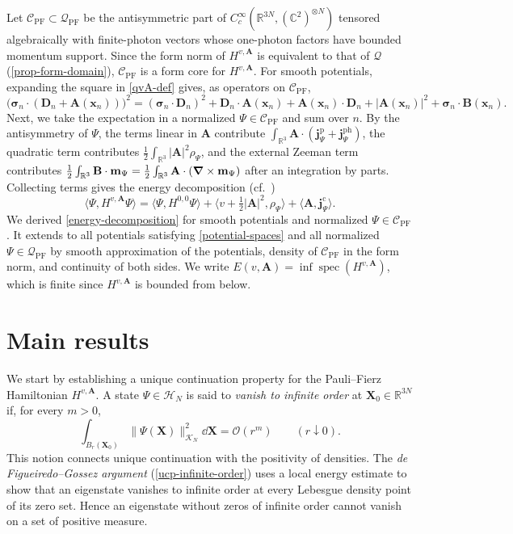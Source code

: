 \documentclass[final,reqno]{amsart}
\DeclareMathOperator{\spec}{spec}
\theoremstyle{remark}
\newcommand{\RR}{\mathbb{R}}
\newcommand{\CC}{\mathbb{C}}
\newcommand{\dua}[2]{\langle #1, #2 \rangle}
\newcommand{\HC}{\mathcal{H}}
\newcommand{\Cc}{\mathcal{C}}
\newcommand{\vjp}{\mathbf{j}^{\mathrm{p}}}
\newcommand{\vjph}{\mathbf{j}^{\mathrm{ph}}}
\newcommand{\vjc}{\mathbf{j}^{\mathrm{c}}}
\newcommand{\PF}{\mathrm{PF}}
\newcommand{\vsigma}{{\bm{\sigma}}}
\newcommand{\vm}{\mathbf{m}}
\newcommand{\vx}{\mathbf{x}}
\newcommand{\vA}{{\mathbf{A}}}
\newcommand{\vB}{{\mathbf{B}}}
\newcommand{\vX}{{\mathbf{X}}}
\newcommand{\vD}{{\mathbf{D}}}
\begin{document}
Let $\Cc_\PF\subset\mathcal Q_\PF$ be the antisymmetric part of
$C_c^\infty(\RR^{3N},(\CC^2)^{\otimes N})$ tensored algebraically with
finite-photon vectors whose one-photon factors have bounded momentum
support.  Since the form norm of $H^{v,\vA}$ is equivalent to that of
$\mathcal Q$ (\cref{prop-form-domain}), $\Cc_\PF$ is a form core
for $H^{v,\vA}$.  For smooth potentials, expanding the square in
\cref{qvA-def} gives, as operators on $\Cc_\PF$,
\[
 \bigl(\vsigma_n\cdot(\vD_n+\vA(\vx_n))\bigr)^2
 =(\vsigma_n\cdot\vD_n)^2
  +\vD_n\cdot\vA(\vx_n)+\vA(\vx_n)\cdot\vD_n
  +|\vA(\vx_n)|^2+\vsigma_n\cdot\vB(\vx_n).
\]
Next, we take the expectation in a normalized $\Psi\in\Cc_\PF$ and sum over
$n$.  By the antisymmetry of $\Psi$, the terms linear in $\vA$ contribute
$\int_{\RR^3}\vA\cdot(\vjp_\Psi+\vjph_\Psi)$, the quadratic term
contributes $\frac12\int_{\RR^3}|\vA|^2\rho_\Psi$, and the external
Zeeman term contributes
$\frac12\int_{\RR^3}\vB\cdot\vm_\Psi
 =\frac12\int_{\RR^3}\vA\cdot(\grad\times\vm_\Psi)$
after an integration by parts.  Collecting terms gives the energy
decomposition (cf.~\cite[Section~2.3.2]{garrigue2020unique})
\begin{equation}\label{energy-decomposition}
 \dua{\Psi}{H^{v,\vA}\Psi}
 =\dua{\Psi}{H^{0,0}\Psi}
  +\dua{v+\tfrac12|\vA|^2}{\rho_\Psi}+\dua{\vA}{\vjc_\Psi}.
\end{equation}
We derived \cref{energy-decomposition} for smooth potentials and
normalized $\Psi\in\Cc_\PF$.  It extends to all potentials satisfying
\cref{potential-spaces} and all normalized $\Psi\in\mathcal Q_\PF$ by smooth
approximation of the potentials, density of $\Cc_\PF$ in the form norm,
and continuity of both sides.
We write $E(v,\vA)=\inf\spec(H^{v,\vA})$, which is finite since
$H^{v,\vA}$ is bounded from below.

\section{Main results}\label{sec-main-results}

We start by establishing a unique continuation property for the
Pauli--Fierz Hamiltonian $H^{v,\vA}$.
A state $\Psi\in\HC_N$ is said to \emph{vanish to infinite order} at
$\vX_0\in\RR^{3N}$ if, for every $m>0$,
\[
 \int_{B_r(\vX_0)}\|\Psi(\vX)\|_{\mathcal K_N}^2\dd\vX=\mathcal O(r^m)
 \qquad(r\downarrow0).
\]
This notion connects unique continuation with the positivity of
densities.  The \emph{de Figueiredo--Gossez argument}
\cite{defigueiredo1992strict} (\cref{ucp-infinite-order}) uses a local
energy estimate to show that an eigenstate vanishes to infinite order
at every Lebesgue density point of its zero set.  Hence an eigenstate
without zeros of infinite order cannot vanish on a set of positive
measure.
\end{document}
